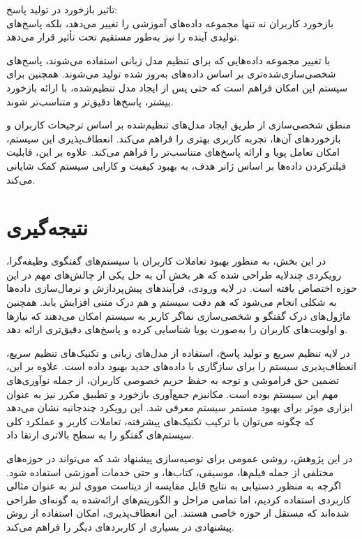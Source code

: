 \begin{enumerate}
تاثیر بازخورد در تولید پاسخ:\\
بازخورد کاربران نه تنها مجموعه داده‌های آموزشی را تغییر می‌دهد، بلکه پاسخ‌های تولیدی آینده را نیز به‌طور مستقیم تحت تأثیر قرار می‌دهد.

با تغییر مجموعه داده‌هایی که برای تنظیم مدل زبانی استفاده می‌شوند، پاسخ‌های شخصی‌سازی‌شده‌تری بر اساس داده‌های به‌روز شده تولید می‌شوند.
همچنین برای سیستم این امکان فراهم است که حتی پس از ایجاد مدل تنظیم‌شده، با ارائه بازخورد بیشتر، پاسخ‌ها دقیق‌تر و متناسب‌تر شوند.

منطق شخصی‌سازی از طریق ایجاد مدل‌های تنظیم‌شده بر اساس ترجیحات کاربران و بازخوردهای آن‌ها، تجربه کاربری بهتری را فراهم می‌کند. انعطاف‌پذیری این سیستم، امکان تعامل پویا و ارائه پاسخ‌های متناسب‌تر را فراهم می‌کند. علاوه بر این، قابلیت فیلترکردن داده‌ها بر اساس ژانر هدف، به بهبود کیفیت و کارایی سیستم کمک شایانی می‌کند.

\end{enumerate}


\section{نتیجه‌گیری}
در این بخش، به منظور بهبود تعاملات کاربران با سیستم‌های گفتگوی وظیفه‌گرا، رویکردی چندلایه طراحی شده که هر بخش آن به حل یکی از چالش‌های مهم در این حوزه اختصاص یافته است. در لایه ورودی، فرآیندهای پیش‌پردازش و نرمال‌سازی داده‌ها به شکلی انجام می‌شود که هم دقت سیستم و هم درک متنی افزایش یابد. همچنین ماژول‌های درک گفتگو و شخصی‌سازی نماگر کاربر به سیستم امکان می‌دهند که نیازها و اولویت‌های کاربران را به‌صورت پویا شناسایی کرده و پاسخ‌های دقیق‌تری ارائه دهد.

در لایه تنظیم سریع و تولید پاسخ، استفاده از مدل‌های زبانی و تکنیک‌های تنظیم سریع، انعطاف‌پذیری سیستم را برای سازگاری با داده‌های جدید بهبود داده است. علاوه بر این، تضمین حق فراموشی و توجه به حفظ حریم خصوصی کاربران، از جمله نوآوری‌های مهم این سیستم بوده است. مکانیزم جمع‌آوری بازخورد و تطبیق مکرر نیز به عنوان ابزاری موثر برای بهبود مستمر سیستم معرفی شد. این رویکرد چندجانبه نشان می‌دهد که چگونه می‌توان با ترکیب تکنیک‌های پیشرفته، تعاملات کاربر و عملکرد کلی سیستم‌های گفتگو را به سطح بالاتری ارتقا داد.

در این پژوهش، روشی عمومی برای توصیه‌سازی پیشنهاد شد که می‌تواند در حوزه‌های مختلفی از جمله فیلم‌ها، موسیقی، کتاب‌ها، و حتی خدمات آموزشی استفاده شود. اگرچه به منظور دستیابی به نتایج قابل مقایسه از دیتاست مووی لنز به عنوان مثالی کاربردی استفاده کردیم، اما تمامی مراحل و الگوریتم‌های ارائه‌شده به گونه‌ای طراحی شده‌اند که مستقل از حوزه خاصی هستند. این انعطاف‌پذیری، امکان استفاده از روش پیشنهادی در بسیاری از کاربردهای دیگر را فراهم می‌کند.

